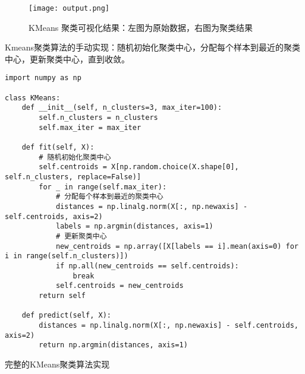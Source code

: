\documentclass{article}
\begin{document}
\begin{figure}[h]
\centering
\texttt{[image: output.png]}
\caption{KMeans 聚类可视化结果：左图为原始数据，右图为聚类结果}
\end{figure}

Kmeans聚类算法的手动实现：随机初始化聚类中心，分配每个样本到最近的聚类中心，更新聚类中心，直到收敛。

\begin{lstlisting}
import numpy as np

class KMeans:
    def __init__(self, n_clusters=3, max_iter=100):
        self.n_clusters = n_clusters
        self.max_iter = max_iter

    def fit(self, X):
        # 随机初始化聚类中心
        self.centroids = X[np.random.choice(X.shape[0], self.n_clusters, replace=False)]
        for _ in range(self.max_iter):
            # 分配每个样本到最近的聚类中心
            distances = np.linalg.norm(X[:, np.newaxis] - self.centroids, axis=2)
            labels = np.argmin(distances, axis=1)
            # 更新聚类中心
            new_centroids = np.array([X[labels == i].mean(axis=0) for i in range(self.n_clusters)])
            if np.all(new_centroids == self.centroids):
                break
            self.centroids = new_centroids
        return self

    def predict(self, X):
        distances = np.linalg.norm(X[:, np.newaxis] - self.centroids, axis=2)
        return np.argmin(distances, axis=1)
\end{lstlisting}

完整的KMeans聚类算法实现
\end{document}
